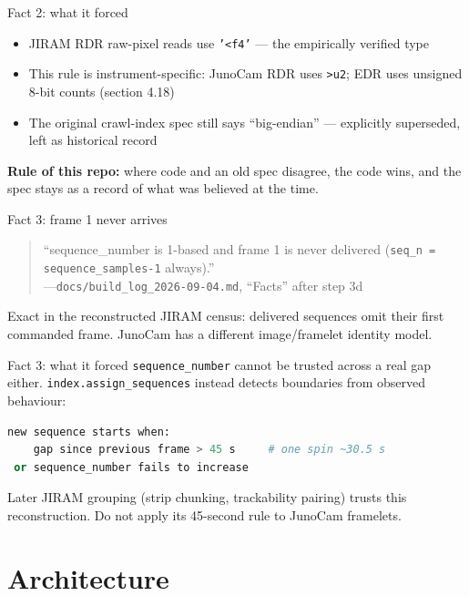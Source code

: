 \documentclass[aspectratio=169,11pt]{beamer}
\newcommand{\currevsec}{}
\newcommand{\revsec}[1]{\gdef\currevsec{#1}}
\begin{document}
\begin{frame}{Fact 2: what it forced}
  \revsec{2.2}
  \begin{itemize}
    \item JIRAM RDR raw-pixel reads use \texttt{'<f4'} --- the empirically verified type
    \item This rule is instrument-specific: JunoCam RDR uses \texttt{>u2}; EDR uses unsigned 8-bit counts (section 4.18)
    \item The original crawl-index spec still says ``big-endian'' --- explicitly superseded, left as historical record
  \end{itemize}
  \vspace{0.3cm}
  \textbf{Rule of this repo:} where code and an old spec disagree, the code wins, and the spec stays as a record of what was believed at the time.
\end{frame}

\begin{frame}{Fact 3: frame 1 never arrives}
  \revsec{2.3}
  \begin{quote}\small\raggedright
    ``sequence\_number is 1-based and frame 1 is never delivered (\texttt{seq\_n = sequence\_samples-1} always).'' \\
    \hfill---\texttt{docs/build\_log\_2026-09-04.md}, ``Facts'' after step 3d
  \end{quote}
  Exact in the reconstructed JIRAM census: delivered sequences omit their first commanded frame. JunoCam has a different image/framelet identity model.
\end{frame}

\begin{frame}[fragile]{Fact 3: what it forced}
  \revsec{2.3}
  \texttt{sequence\_number} cannot be trusted across a real gap either. \texttt{index.assign\_sequences} instead detects boundaries from observed behaviour:
\begin{lstlisting}[language=Python]
new sequence starts when:
    gap since previous frame > 45 s     # one spin ~30.5 s
 or sequence_number fails to increase
\end{lstlisting}
  Later JIRAM grouping (strip chunking, trackability pairing) trusts this reconstruction. Do not apply its 45-second rule to JunoCam framelets.
\end{frame}

\section{Architecture}
\end{document}
